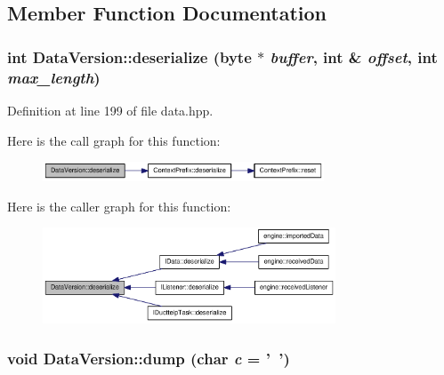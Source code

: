 \subsection{Member Function Documentation}
\hypertarget{struct_data_version_ac5bce97d68ce11492781071558bb1191}{
\subsubsection[{deserialize}]{\setlength{\rightskip}{0pt plus 5cm}int DataVersion::deserialize ({\bf byte} $\ast$ {\em buffer}, \/  int \& {\em offset}, \/  int {\em max\_\-length})}}
\label{struct_data_version_ac5bce97d68ce11492781071558bb1191}


Definition at line 199 of file data.hpp.

Here is the call graph for this function:\nopagebreak
\begin{figure}[H]
\begin{center}
\leavevmode
\includegraphics[width=237pt]{struct_data_version_ac5bce97d68ce11492781071558bb1191_cgraph}
\end{center}
\end{figure}


Here is the caller graph for this function:\nopagebreak
\begin{figure}[H]
\begin{center}
\leavevmode
\includegraphics[width=247pt]{struct_data_version_ac5bce97d68ce11492781071558bb1191_icgraph}
\end{center}
\end{figure}
\hypertarget{struct_data_version_a03b5b85b2c309989eb96c2248b0dedfa}{
\subsubsection[{dump}]{\setlength{\rightskip}{0pt plus 5cm}void DataVersion::dump (char {\em c} = {\ttfamily '~'})}}
\label{struct_data_version_a03b5b85b2c309989eb96c2248b0dedfa}



